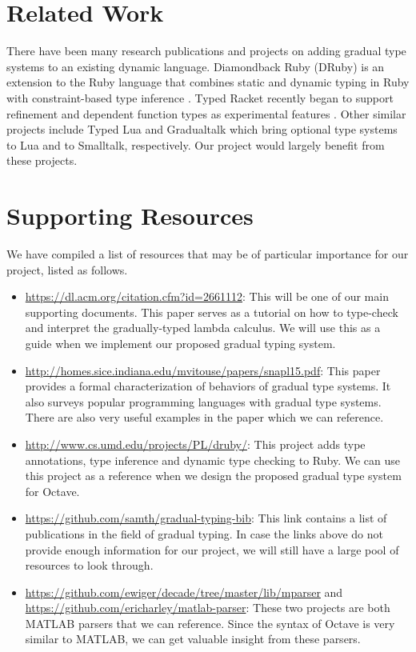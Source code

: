 \section{Related Work}
There have been many research publications and projects on adding gradual type
systems to an existing dynamic language. Diamondback Ruby (DRuby) is an
extension to the Ruby language that combines static and dynamic typing in Ruby
with constraint-based type inference \cite{furr2009combining}. Typed Racket
\cite{tobin2006interlanguage} recently began to support refinement and dependent
function types as experimental features \cite{racket2017refinement}. Other
similar projects include Typed Lua \cite{maidl2014typed} and Gradualtalk
\cite{allende2014gradual} which bring optional type systems to Lua and to
Smalltalk, respectively. Our project would largely benefit from these projects.

\section{Supporting Resources}
\label{sec-supporting-resources}
We have compiled a list of resources that may be of particular importance for
our project, listed as follows.

\begin{itemize}
    \item \url{https://dl.acm.org/citation.cfm?id=2661112}: This will be one of
        our main supporting documents. This paper serves as a tutorial on how to
        type-check and interpret the gradually-typed lambda calculus. We will
        use this as a guide when we implement our proposed gradual typing
        system.
    \item \url{http://homes.sice.indiana.edu/mvitouse/papers/snapl15.pdf}: This
        paper provides a formal characterization of behaviors of gradual type
        systems. It also surveys popular programming languages with gradual type
        systems. There are also very useful examples in the paper which we can
        reference.
    \item \url{http://www.cs.umd.edu/projects/PL/druby/}: This project adds type
        annotations, type inference and dynamic type checking to Ruby. We can
        use this project as a reference when we design the proposed gradual type
        system for Octave.
    \item \url{https://github.com/samth/gradual-typing-bib}: This link contains
        a list of publications in the field of gradual typing. In case the links
        above do not provide enough information for our project, we will still
        have a large pool of resources to look through.
    \item \url{https://github.com/ewiger/decade/tree/master/lib/mparser} and
        \url{https://github.com/ericharley/matlab-parser}: These two projects
        are both MATLAB parsers that we can reference. Since the syntax of
        Octave is very similar to MATLAB, we can get valuable insight from these
        parsers.
\end{itemize}

